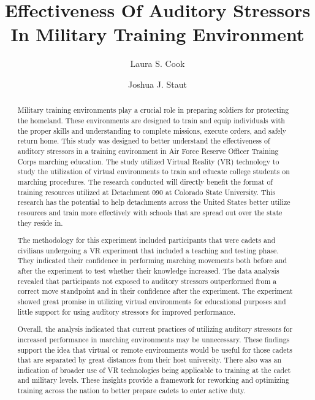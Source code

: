 \documentclass[manuscript,screen,review]{acmart}
\begin{document}
\title{Effectiveness Of Auditory Stressors In Military Training Environment}

\author{Laura S. Cook}
\author{Joshua J. Staut}


\begin{abstract}
  Military training environments play a crucial role in preparing soldiers for protecting 
  the homeland. These environments are designed to train and equip individuals with the 
  proper skills and understanding to complete missions, execute orders, and safely return home. 
  This study was designed to better understand the effectiveness of auditory stressors in a training 
  environment in Air Force Reserve Officer Training Corps marching education. The study utilized 
  Virtual Reality (VR) technology to study the utilization of virtual environments to train and 
  educate college students on marching procedures. The research conducted will directly benefit 
  the format of training resources utilized at Detachment 090 at Colorado State University. This 
  research has the potential to help detachments across the United States better utilize 
  resources and train more effectively with schools that are spread out over the state they 
  reside in.  

The methodology for this experiment included participants that were cadets and civilians 
undergoing a VR experiment that included a teaching and testing phase. They indicated their 
confidence in performing marching movements both before and after the experiment to test whether 
their knowledge increased. The data analysis revealed that participants not exposed to auditory 
stressors outperformed from a correct move standpoint and in their confidence after the 
experiment. The experiment showed great promise in utilizing virtual environments for educational 
purposes and little support for using auditory stressors for improved performance.  

Overall, the analysis indicated that current practices of utilizing auditory stressors for increased 
performance in marching environments may be unnecessary. These findings support the idea that virtual 
or remote environments would be useful for those cadets that are separated by great distances from 
their host university. There also was an indication of broader use of VR technologies being applicable 
to training at the cadet and military levels. These insights provide a framework for reworking and 
optimizing training across the nation to better prepare cadets to enter active duty.  
\end{abstract}
\end{document}
